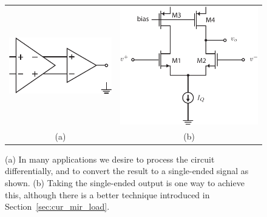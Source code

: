 \begin{figure}[tb]
\centering
\begin{tabular}{cc}
\includegraphics[scale=1]{Diff_in_SE_out.pdf} &
\includegraphics[scale=1]{diffamp_SE_out_simp}\\
(a) & (b)\\
\end{tabular}
\caption{(a) In many applications we desire to process the circuit differentially, and to convert the result to a single-ended signal as shown.   (b) Taking the single-ended output is one way to achieve this, although there is a better technique introduced in Section~\ref{sec:cur_mir_load}.} \label{fig:Diff_in_SE_out.pdf}
\end{figure}
